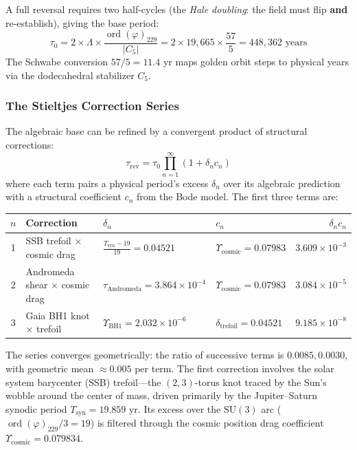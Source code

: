 A full reversal requires two half-cycles (the \emph{Hale doubling}: the field must flip \textbf{and} re-establish), giving the base period:
\begin{equation}\label{eq:reversal_base}
    \tau_0 = 2 \times \Lambda \times \frac{\operatorname{ord}(\varphi)_{229}}{|C_5|} = 2 \times 19{,}665 \times \frac{57}{5} = 448{,}362 \text{ years}
\end{equation}
The Schwabe conversion $57/5 = 11.4$ yr maps golden orbit steps to physical years via the dodecahedral stabilizer $C_5$.

\subsubsection{The Stieltjes Correction Series}

The algebraic base can be refined by a convergent product of structural corrections:
\begin{equation}\label{eq:stieltjes}
    \tau_{\mathrm{rev}} = \tau_0 \prod_{n=1}^{\infty} (1 + \delta_n c_n)
\end{equation}
where each term pairs a physical period's excess $\delta_n$ over its algebraic prediction with a structural coefficient $c_n$ from the Bode model. The first three terms are:

\begin{center}
\renewcommand{\arraystretch}{1.3}
\begin{tabular}{clllr}
\hline
$n$ & Correction & $\delta_n$ & $c_n$ & $\delta_n c_n$ \\
\hline
1 & SSB trefoil $\times$ cosmic drag & $\frac{T_{\mathrm{syn}} - 19}{19} = 0.04521$ & $\Upsilon_{\mathrm{cosmic}} = 0.07983$ & $3.609 \times 10^{-3}$ \\
2 & Andromeda shear $\times$ cosmic drag & $\tau_{\mathrm{Andromeda}} = 3.864 \times 10^{-4}$ & $\Upsilon_{\mathrm{cosmic}} = 0.07983$ & $3.084 \times 10^{-5}$ \\
3 & Gaia BH1 knot $\times$ trefoil & $\Upsilon_{\mathrm{BH1}} = 2.032 \times 10^{-6}$ & $\delta_{\mathrm{trefoil}} = 0.04521$ & $9.185 \times 10^{-8}$ \\
\hline
\end{tabular}
\end{center}

The series converges geometrically: the ratio of successive terms is $0.0085, 0.0030$, with geometric mean $\approx 0.005$ per term. The first correction involves the solar system barycenter (SSB) trefoil---the $(2,3)$-torus knot traced by the Sun's wobble around the center of mass, driven primarily by the Jupiter--Saturn synodic period $T_{\mathrm{syn}} = 19.859$ yr. Its excess over the $\mathrm{SU}(3)$ arc ($\operatorname{ord}(\varphi)_{229}/3 = 19$) is filtered through the cosmic position drag coefficient $\Upsilon_{\mathrm{cosmic}} = 0.079834$.

